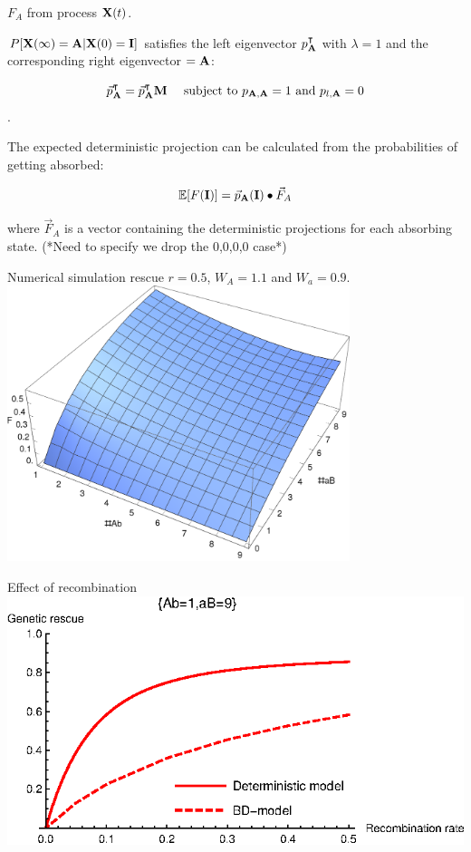 \documentclass{beamer}
\begin{document}
\begin{frame}{$F_A$ from process $\bold{X}(t)$.}
    
    $P[\bold{X}(\infty) = \bold{A}| \bold{X}(0) = \bold{I}]$ satisfies the left eigenvector $p_\bold{A}^\intercal$ with $\lambda = 1$ and the corresponding right eigenvector $=\bold{A}$:
    
    \begin{equation*}
        \vec{p}_\bold{A}^\intercal = \vec{p}_\bold{A}^\intercal \bold{M} \ \ \ \  \text{subject to } p_{\bold{A},\bold{A}}=1 \ \text{and}\ p_{l,\bold{A}}=0
    \end{equation*}.
    
    The expected deterministic projection can be calculated from the probabilities of getting absorbed: 
    
    \begin{equation*}
        \mathbb{E}[F(\bold{I})] = \vec{p}_\bold{A}(\bold{I}) \bullet \vec{F}_A   %
    \end{equation*}
    
    where $\vec{F}_A$ is a vector containing the deterministic projections for each absorbing state. (*Need to specify we drop the {0,0,0,0} case*)
\end{frame}

\begin{frame}{Numerical simulation rescue}
    $r=0.5$,  $W_A=1.1$ and $W_a=0.9$.
    \includegraphics[width=0.75\textwidth]{Matlab/Figures/Projection3DPlotr050.eps}
\end{frame}

\begin{frame}{Effect of recombination}
\includegraphics[width=1\textwidth]{Matlab/Figures/recombinationplot.eps}
\end{frame}
\end{document}
